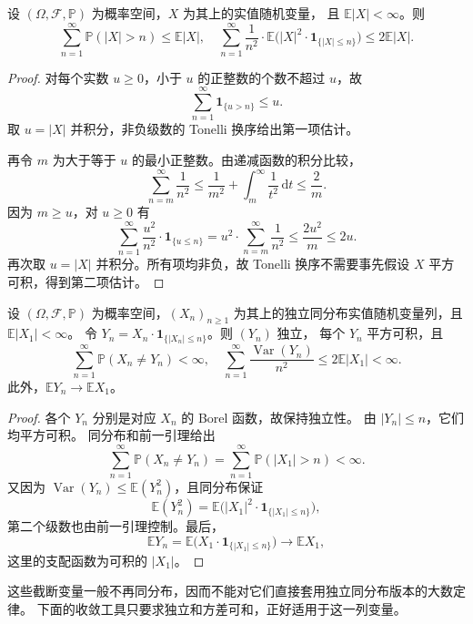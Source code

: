 \begin{lemma}[一次矩控制的截断估计]
\label{b1:lem:30-truncation-sums}
设 \((\Omega,\mathcal F,\mathbb P)\) 为概率空间，\(X\) 为其上的实值随机变量，
且 \(\mathbb E|X|<\infty\)。则
\[
 \sum_{n=1}^\infty\mathbb P(|X|>n)\leq\mathbb E|X|,
 \quad
 \sum_{n=1}^\infty\frac1{n^2}\cdot
       \mathbb E\bigl(|X|^2\cdot\mathbf1_{\{|X|\leq n\}}\bigr)
 \leq2\mathbb E|X|.
\]
\end{lemma}
\begin{proof}
对每个实数 \(u\geq0\)，小于 \(u\) 的正整数的个数不超过 \(u\)，故
\[
 \sum_{n=1}^\infty\mathbf1_{\{u>n\}}\leq u.
\]
取 \(u=|X|\) 并积分，非负级数的 Tonelli 换序给出第一项估计。

再令 \(m\) 为大于等于 \(u\) 的最小正整数。由递减函数的积分比较，
\[
 \sum_{n=m}^\infty\frac1{n^2}
 \leq\frac1{m^2}+\int_m^\infty\frac1{t^2}\,\mathrm dt
 \leq\frac2m.
\]
因为 \(m\geq u\)，对 \(u\geq0\) 有
\[
 \sum_{n=1}^\infty\frac{u^2}{n^2}\cdot\mathbf1_{\{u\leq n\}}
 =u^2\cdot\sum_{n=m}^\infty\frac1{n^2}
 \leq\frac{2u^2}{m}\leq2u.
\]
再次取 \(u=|X|\) 并积分。所有项均非负，故 Tonelli 换序不需要事先假设
\(X\) 平方可积，得到第二项估计。
\end{proof}

\begin{proposition}[随指标增长的截断]
\label{b1:prop:30-moving-truncation}
设 \((\Omega,\mathcal F,\mathbb P)\) 为概率空间，\((X_n)_{n\geq1}\)
为其上的独立同分布实值随机变量列，且 \(\mathbb E|X_1|<\infty\)。
令 \(Y_n=X_n\cdot\mathbf1_{\{|X_n|\leq n\}}\)。则 \((Y_n)\) 独立，
每个 \(Y_n\) 平方可积，且
\[
 \sum_{n=1}^\infty\mathbb P(X_n\ne Y_n)<\infty,
 \quad
 \sum_{n=1}^\infty\frac{\operatorname{Var}(Y_n)}{n^2}
 \leq2\mathbb E|X_1|<\infty.
\]
此外，\(\mathbb E Y_n\to\mathbb E X_1\)。
\end{proposition}
\begin{proof}
各个 \(Y_n\) 分别是对应 \(X_n\) 的 Borel 函数，故保持独立性。
由 \(|Y_n|\leq n\)，它们均平方可积。
同分布和前一引理给出
\[
 \sum_{n=1}^\infty\mathbb P(X_n\ne Y_n)
 =\sum_{n=1}^\infty\mathbb P(|X_1|>n)<\infty.
\]
又因为 \(\operatorname{Var}(Y_n)\leq\mathbb E(Y_n^2)\)，且同分布保证
\[
 \mathbb E(Y_n^2)
 =\mathbb E\bigl(|X_1|^2\cdot\mathbf1_{\{|X_1|\leq n\}}\bigr),
\]
第二个级数也由前一引理控制。最后，
\[
 \mathbb E Y_n
 =\mathbb E\bigl(X_1\cdot\mathbf1_{\{|X_1|\leq n\}}\bigr)
 \longrightarrow\mathbb E X_1,
\]
这里的支配函数为可积的 \(|X_1|\)。
\end{proof}

这些截断变量一般不再同分布，因而不能对它们直接套用独立同分布版本的大数定律。
下面的收敛工具只要求独立和方差可和，正好适用于这一列变量。

